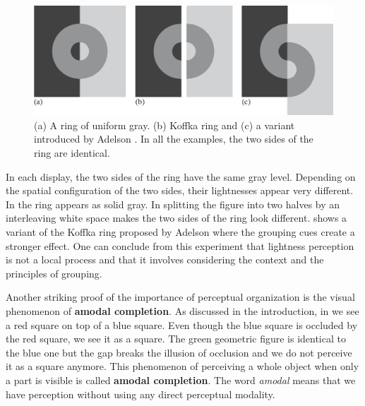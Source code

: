 \begin{figure}[t]
    \centerline{
        \includegraphics[width=1\linewidth]{figures/taxonomy/koffka_ring.eps}
    }
    \caption{(a) A ring of uniform gray. (b) Koffka ring and (c) a variant introduced by Adelson \cite{Adelson99}.  In all the examples, the two sides of the ring are identical.}
    \label{fig:koffka_ring}
\end{figure}

In each display, the two sides of the ring have the same gray level. Depending on the spatial configuration of the two sides, their lightnesses appear very different. In  the ring appears as solid gray. In  splitting the figure into two halves by an interleaving white space makes the two sides of the ring look different.  shows a variant of the Koffka ring proposed by Adelson \cite{Adelson99} where the grouping cues create a stronger effect. One can conclude from this experiment that lightness perception is not a local process and that it involves considering the context and the principles of grouping.





Another striking proof of the importance of perceptual organization is the visual phenomenon of {\bf amodal completion}.
As discussed in the introduction, in  we see a red square on top of a blue square. Even though the blue square is occluded by the red square, we see it as a square. The green geometric figure is identical to the blue one but the gap breaks the illusion of occlusion and we do not perceive it as a square anymore. This phenomenon of perceiving a whole object when only a part is visible is called {\bf amodal completion}. The word {\em amodal} means that we have perception without using any direct perceptual modality.

